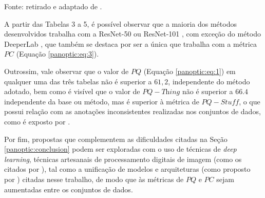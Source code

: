 \begin{table}[H]
    \centering
    \caption{Comparação de desempenho no \textit{dataset} Mapillary.}
    \label{conclusion:table:3}

    \vspace*{1 cm}
    Fonte: retirado e adaptado de \cite{Awesome-panoptic-segmentation:List}.
\end{table}

A partir das Tabelas 3 a 5, é possível observar que a maioria dos métodos desenvolvidos trabalha com a ResNet-50 ou ResNet-101 \cite{He2016}, com exceção do método DeeperLab \cite{Yang2019}, que também se destaca por ser a única que trabalha com a métrica $PC$ (Equação \ref{panoptic:eq:3}).

Outrossim, vale observar que o valor de $PQ$ (Equação \ref{panoptic:eq:1}) em qualquer uma das três tabelas não é superior a $61,2$, independente do método adotado, bem como é visível que o valor de $PQ-\textit{Thing}$ não é superior a  $66.4$ independente da base ou método, mas é superior à métrica de $PQ-\textit{Stuff}$, o que possui relação com as anotações inconsistentes realizadas nos conjuntos de dados, como é exposto por \cite{Kirillov2019a}.

Por fim, propostas que complementem as dificuldades citadas na Seção \ref{panoptic:conclusion} podem ser exploradas com o uso de técnicas de \textit{deep learning}, técnicas artesanais de processamento digitais de imagem (como os citados por \cite{pedrini2008analise}), tal como a unificação de modelos e arquiteturas (como proposto por \cite{Liu2019}) citadas nesse trabalho, de modo que às métricas de $PQ$ e $PC$ sejam aumentadas entre os conjuntos de dados.
